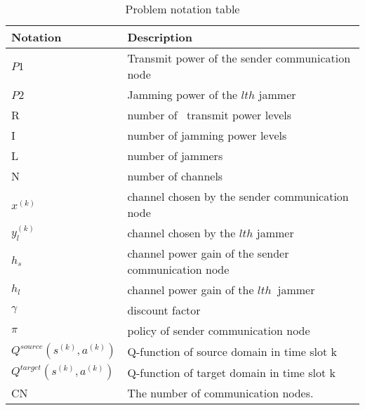 \documentclass[letterpaper%
, oneside%
, 12pt%
,thesepararticles%
, english%
,creativecommons,hyperref, withAlgo2e%
]{thETS}
\begin{document}
\begin{table}[!h]
        \centering
        
        \parbox{0.65\textwidth}{\caption{Problem notation table}\label{tab:testAp}}
        
\begin{tabular}{|p{}|p{}|}
\hline 
 Notation & Description \\
\hline 
 $\displaystyle P1$ & Transmit power of the sender communication node \\
\hline 
 $\displaystyle P$2 & Jamming power of the $\displaystyle lth$ jammer \\
\hline 
 R & number of \ transmit power levels \\
\hline 
 I & number of jamming power levels \\
\hline 
 L & number of jammers \\
\hline 
 N  & number of channels \\
\hline 
 $\displaystyle x^{( k)}$ & channel chosen by the sender communication node \\
\hline 
 $\displaystyle y_{l}^{( k)}$ & channel chosen by the $\displaystyle lth$ jammer \\
\hline 
 $\displaystyle h_{s}$ & channel power gain of the sender communication node \\
\hline 
 $\displaystyle h_{l}$ & channel power gain of the $\displaystyle lth\ $ jammer \\
\hline 
 $\displaystyle \gamma $ & discount factor \\
\hline 
 $\displaystyle \pi $ & policy of sender communication node \\
\hline 
 $\displaystyle Q^{source}\left( s^{( k)} ,a^{( k)}\right)$ & Q-function of source domain in time slot k \\
\hline 
 $\displaystyle Q^{target}\left( s^{( k)} ,a^{( k)}\right)$ & Q-function of target domain in time slot k \\
\hline 
 CN & The number of communication nodes. \\
 \hline
\end{tabular}
        
 \end{table}
 
\end{document}
